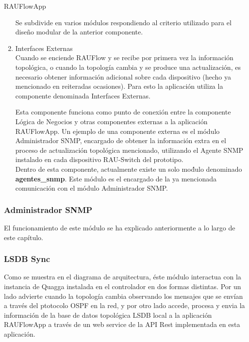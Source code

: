 \begin{subsubsection}{RAUFlowApp}
\begin{enumerate}
Se subdivide en varios m\'odulos respondiendo al criterio utilizado para el dise\~no modular de la anterior componente. 

\item Interfaces Externas\\
Cuando se enciende RAUFlow y se recibe por primera vez la informaci\'on topol\'ogica, o cuando la topolog\'ia cambia y se produce una actualizaci\'on, es necesario obtener informaci\'on adicional sobre cada dispositivo (hecho ya mencionado en reiteradas ocasiones). Para esto la aplicaci\'on utiliza la componente denominada Interfaces Externas. 

Esta componente funciona como punto de conexi\'on entre la componente L\'ogica de Negocios y otras componentes externas a la aplicaci\'on RAUFlowApp. Un ejemplo de una componente externa es el m\'odulo Administrador SNMP, encargado de obtener la informaci\'on extra en el proceso de actualizaci\'on topol\'ogica mencionado, utilizando el Agente SNMP instalado en cada dispositivo RAU-Switch del prototipo.\\

Dentro de esta componente, actualmente existe un solo mo\'dulo denominado \textbf{agentes\_snmp}. Este m\'odulo es el encargado de la ya mencionada comunicaci\'on con el m\'odulo Administrador SNMP. \\ 

\end{enumerate}

\end{subsubsection}

\subsubsection{Administrador SNMP}
El funcionamiento de este m\'odulo se ha explicado anteriormente a lo largo de este cap\'itulo.

\subsubsection{LSDB Sync}
Como se muestra en el diagrama de arquitectura, \'este m\'odulo interactua con la instancia de Quagga instalada en el controlador en dos formas distintas. Por un lado advierte cuando la topolog\'ia cambia observando los mensajes que se env\'ian a través del ptotocolo OSPF en la red, y por otro lado accede, procesa y envia la informaci\'on de la base de datos topol\'ogica LSDB local a la aplicaci\'on RAUFlowApp a trav\'es de un web service de la API Rest implementada en esta aplicaci\'on.
 
